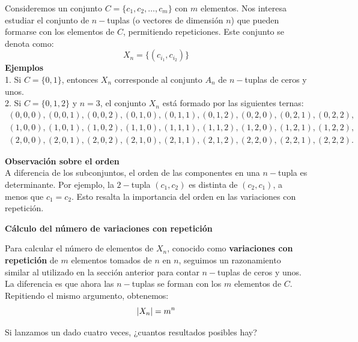\documentclass[12pt,a4paper]{book}
\begin{document}
    Consideremos un conjunto $C=\{c_{1},c_{2},\dots,c_{m}\}$ con $m$ elementos. Nos interesa estudiar el conjunto de $n-$tuplas (o vectores de dimensión $n$) que pueden formarse con los elementos de $C$, permitiendo repeticiones. Este conjunto se denota como:
    \begin{equation*}
        X_{n}=\{(c_{i_{1}},c_{i_{2}})\}
    \end{equation*}
    \textbf{Ejemplos}\\
    1. Si $C=\{0,1\}$, entonces $X_{n}$ corresponde al conjunto $A_{n}$ de $n-$tuplas de ceros y unos.\\
    2. Si $C=\{0,1,2\}$ y $n=3$, el conjunto $X_{n}$ está formado por las siguientes ternas:
    \begin{equation*}
        \begin{array}{c}
            (0, 0, 0), (0, 0, 1), (0, 0, 2), (0, 1, 0), (0, 1, 1), (0, 1, 2), (0, 2, 0), (0, 2, 1), (0, 2, 2), \\
            (1, 0, 0), (1, 0, 1), (1, 0, 2), (1, 1, 0), (1, 1, 1), (1, 1, 2), (1, 2, 0), (1, 2, 1), (1, 2, 2), \\
            (2, 0, 0), (2, 0, 1), (2, 0, 2), (2, 1, 0), (2, 1, 1), (2, 1, 2), (2, 2, 0), (2, 2, 1), (2, 2, 2).
        \end{array}
    \end{equation*}

    \textbf{Observación sobre el orden}\\
    A diferencia de los subconjuntos, el orden de las componentes en una $n-$tupla es determinante. Por ejemplo, la $2-$tupla $(c_{1},c_{2})$ es distinta de $(c_{2},c_{1})$, a menos que $c_{1}=c_{2}$. Esto resalta la importancia del orden en las variaciones con repetición.

    {\large \textbf{Cálculo del número de variaciones con repetición}}

    Para calcular el número de elementos de $X_{n}$, conocido como \textbf{variaciones con repetición} de $m$ elementos tomados de $n$ en $n$, seguimos un razonamiento similar al utilizado en la sección anterior para contar $n-$tuplas de ceros y unos. La diferencia es que ahora las $n-$tuplas se forman con los $m$ elementos de $C$. Repitiendo el mismo argumento, obtenemos:
    \begin{equation*}
        \abs{X_{n}}=m^{n}
    \end{equation*}

    \begin{mdframed}[style=mdgraybox,frametitle={Problema 13: Lanzamiento de un dado}]
        Si lanzamos un dado cuatro veces, ¿cuantos resultados posibles hay?
    \end{mdframed}
\end{document}
